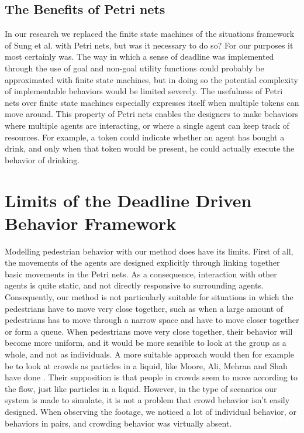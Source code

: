 \documentclass[11pt, a4paper]{book}
\begin{document}
\subsection{The Benefits of Petri nets}
\label{sec:benefits}
In our research we replaced the finite state machines of the situations framework of Sung et al. \cite{Sung04scalablebehaviors} with Petri nets, but was it necessary to do so? For our purposes it most certainly was. The way in which a sense of deadline was implemented through the use of goal and non-goal utility functions could probably be approximated with finite state machines, but in doing so the potential complexity of implementable behaviors would be limited severely. The usefulness of Petri nets over finite state machines especially expresses itself when multiple tokens can move around. This property of Petri nets enables the designers to make behaviors where multiple agents are interacting, or where a single agent can keep track of resources. For example, a token could indicate whether an agent has bought a drink, and only when that token would be present, he could actually execute the behavior of drinking.

%
%
%


\section{Limits of the Deadline Driven Behavior Framework}
Modelling pedestrian behavior with our method does have its limits. First of all, the movements of the agents are designed explicitly through linking together basic movements in the Petri nets. As a consequence, interaction with other agents is quite static, and not directly responsive to surrounding agents. Consequently, our method is not particularly suitable for situations in which the pedestrians have to move very close together, such as when a large amount of pedestrians has to move through a narrow space and have to move closer together or form a queue. When pedestrians move very close together, their behavior will become more uniform, and it would be more sensible to look at the group as a whole, and not as individuals. A more suitable approach would then for example be to look at crowds as particles in a liquid, like Moore, Ali, Mehran and Shah have done \cite{Moore:2011:VCS:2043174.2043192}. Their supposition is that people in crowds seem to move according to the flow, just like particles in a liquid. However, in the type of scenarios our system is made to simulate, it is not a problem that crowd behavior isn't easily designed. When observing the footage, we noticed a lot of individual behavior, or behaviors in pairs, and crowding behavior was virtually absent.\\
\end{document}
